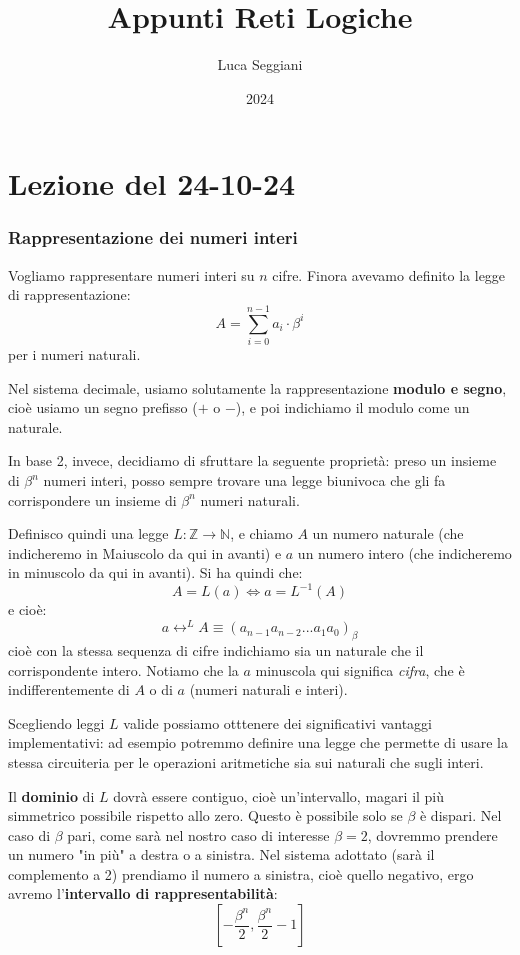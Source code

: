 \documentclass[a4paper,11pt]{article}
\title{Appunti Reti Logiche}
\author{Luca Seggiani}
\date{2024}
\begin{document}
\section{Lezione del 24-10-24}

\thispagestyle{empty}
\pagestyle{fancy}

\subsubsection{Rappresentazione dei numeri interi}
Vogliamo rappresentare numeri interi su $n$ cifre.
Finora avevamo definito la legge di rappresentazione:
$$
A = \sum_{i=0}^{n-1} a_i \cdot \beta^i
$$
per i numeri naturali.

Nel sistema decimale, usiamo solutamente la rappresentazione \textbf{modulo e segno}, cioè usiamo un segno prefisso ($+$ o $-$), e poi indichiamo il modulo come un naturale.

In base 2, invece, decidiamo di sfruttare la seguente proprietà: preso un insieme di $\beta^n$ numeri interi, posso sempre trovare una legge biunivoca che gli fa corrispondere un insieme di $\beta^n$ numeri naturali.

Definisco quindi una legge $L: \mathbb{Z} \rightarrow \mathbb{N}$, e chiamo $A$ un numero naturale (che indicheremo in Maiuscolo da qui in avanti) e $a$ un numero intero (che indicheremo in minuscolo da qui in avanti).
Si ha quindi che:
$$
A = L(a) \Leftrightarrow a = L^{-1}(A)
$$
e cioè:
$$ 
a \leftrightarrow^L A \equiv (a_{n-1}a_{n-2}...a_1a_0)_\beta
$$
cioè con la stessa sequenza di cifre indichiamo sia un naturale che il corrispondente intero.
Notiamo che la $a$ minuscola qui significa \textit{cifra}, che è indifferentemente di $A$ o di $a$ (numeri naturali e interi).

Scegliendo leggi $L$ valide possiamo otttenere dei significativi vantaggi implementativi: ad esempio potremmo definire una legge che permette di usare la stessa circuiteria per le operazioni aritmetiche sia sui naturali che sugli interi.

Il \textbf{dominio} di $L$ dovrà essere contiguo, cioè un'intervallo, magari il più simmetrico possibile rispetto allo zero.
Questo è possibile solo se $\beta$ è dispari.
Nel caso di $\beta$ pari, come sarà nel nostro caso di interesse $\beta = 2$, dovremmo prendere un numero "in più" a destra o a sinistra.
Nel sistema adottato (sarà il complemento a 2) prendiamo il numero a sinistra, cioè quello negativo, ergo avremo l'\textbf{intervallo di rappresentabilità}:
$$
\left[ -\frac{\beta^n}{2}, \frac{\beta^n}{2} - 1 \right]
$$
\end{document}
